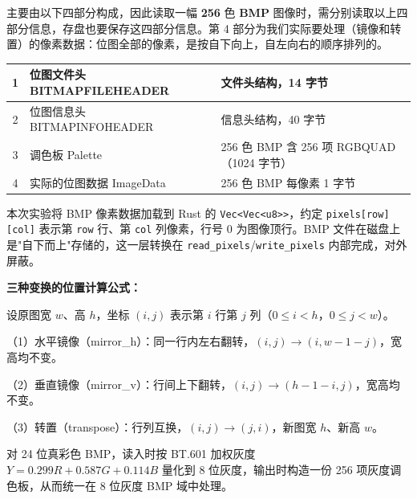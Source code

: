 \noindent\hspace*{2em}主要由以下四部分构成，因此读取一幅 \textbf{256} 色 \textbf{BMP }图像时，需分别读取以上四部分信息，存盘也要保存这四部分信息。第 4 部分为我们实际要处理（镜像和转置）的像素数据：位图全部的像素，是按自下向上，自左向右的顺序排列的。\par
\begin{center}
\fontsize{8.5pt}{11pt}\selectfont
\renewcommand{\arraystretch}{1.12}
\begin{tabular}{|c|l|p{6cm}|}
\hline
1 & 位图文件头 BITMAPFILEHEADER & 文件头结构，14 字节 \\ \hline
2 & 位图信息头 BITMAPINFOHEADER & 信息头结构，40 字节 \\ \hline
3 & 调色板 Palette & 256 色 BMP 含 256 项 RGBQUAD（1024 字节） \\ \hline
4 & 实际的位图数据 ImageData & 256 色 BMP 每像素 1 字节 \\ \hline
\end{tabular}
\end{center}
\noindent\hspace*{2em}本次实验将 BMP 像素数据加载到 Rust 的 \texttt{Vec<Vec<u8>>}，约定 \texttt{pixels[row][col]} 表示第 \texttt{row} 行、第 \texttt{col} 列像素，行号 0 为图像顶行。BMP 文件在磁盘上是"自下而上"存储的，这一层转换在 \texttt{read\_pixels}/\texttt{write\_pixels} 内部完成，对外屏蔽。\par
\noindent\hspace*{2em}\textbf{三种变换的位置计算公式：}\par
\noindent\hspace*{2em}设原图宽 $w$、高 $h$，坐标 $(i, j)$ 表示第 $i$ 行第 $j$ 列（$0 \le i < h$，$0 \le j < w$）。\par
\noindent\hspace*{2em}（1）水平镜像（mirror\_h）：同一行内左右翻转，$(i, j) \to (i, w-1-j)$，宽高均不变。\par
\noindent\hspace*{2em}（2）垂直镜像（mirror\_v）：行间上下翻转，$(i, j) \to (h-1-i, j)$，宽高均不变。\par
\noindent\hspace*{2em}（3）转置（transpose）：行列互换，$(i, j) \to (j, i)$，新图宽 $h$、新高 $w$。\par
\noindent\hspace*{2em}对 24 位真彩色 BMP，读入时按 BT.601 加权灰度 $Y = 0.299R + 0.587G + 0.114B$ 量化到 8 位灰度，输出时构造一份 256 项灰度调色板，从而统一在 8 位灰度 BMP 域中处理。\par
